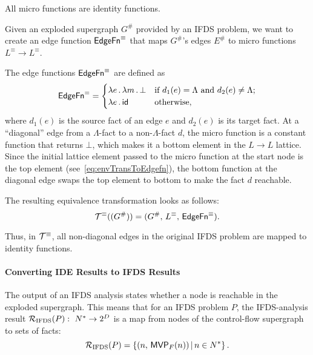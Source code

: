  All micro functions are identity functions.

 
Given an exploded supergraph $G^\#$ provided by an IFDS problem, we want to create an edge function $\textsf{EdgeFn}^\equiv$ that maps $G^\#$'s edges $E^\#$ to micro functions $L^\equiv\to L^\equiv$.

The edge functions $\textsf{EdgeFn}^\equiv$ are defined as
\begin{equation}
    \textsf{EdgeFn}^\equiv=
    \begin{cases}
      \lambda e\,.\,\lambda m\,.\,\bot&\text{if $d_1(e)=\Lambda$ and $d_2(e)\ne\Lambda$;}\\
      \lambda e\,.\,\textsf{id}&\text{otherwise,}
    \end{cases}
\end{equation}
where $d_1(e)$ is the source fact of an edge $e$ and $d_2(e)$ is its target fact. At a ``diagonal'' edge from a $\Lambda$-fact to a non-$\Lambda$-fact $d$, the micro function is a constant function that returns $\bot$, which makes it a bottom element in the $L\to L$ lattice. Since the initial lattice element passed to the micro function at the start node is the top element (see~\eqref{eq:envTransToEdgefn}), the bottom function at the diagonal edge swaps the top element to bottom to make the fact $d$ reachable.

The resulting equivalence transformation looks as follows:
\begin{equation}
  \mathcal T^\equiv((G^\#))=(G^\#,\,L^\equiv,\,\mathsf{EdgeFn}^\equiv).
\end{equation}

Thus, in $\mathcal T^\equiv$, all non-diagonal edges in the original IFDS problem are mapped to identity functions.

\paragraph{Converting IDE Results to IFDS Results}

The output of an IFDS analysis states whether a node is reachable in the exploded supergraph. This means that for an IFDS problem $P$, the IFDS-analysis result $\mathcal R_{\text{IFDS}}(P):\ N^*\to 2^D$ is a map from nodes of the control-flow supergraph to sets of facts:
\begin{equation}
  \mathcal R_{\text{IFDS}}(P)=\{(n,\,\textsf{MVP}_{F}(n))\,|\,n\in N^*\}\,.
\end{equation}

